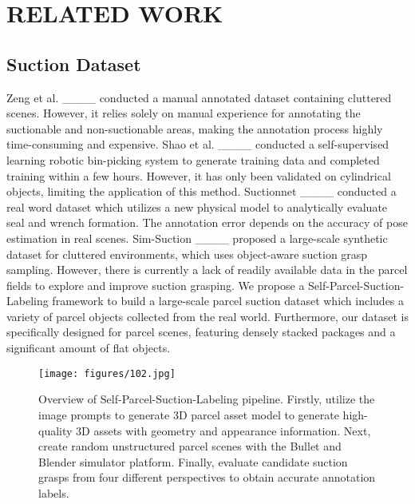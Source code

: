 \section{RELATED WORK}
\label{introduction}



\subsection{Suction Dataset} 
Zeng et al. ____ conducted a manual annotated dataset containing cluttered scenes. However, it relies solely on manual experience for annotating the suctionable and non-suctionable areas, making the annotation process highly time-consuming and expensive. Shao et al. ____ conducted a self-supervised learning robotic bin-picking system to generate training data and completed training within a few hours. However, it has only been validated on cylindrical objects, limiting the application of this method. Suctionnet ____ conducted a real word dataset which utilizes a new physical model to analytically evaluate seal and wrench formation. The annotation error depends on the accuracy of pose estimation in real scenes. Sim-Suction ____ proposed a large-scale synthetic dataset for cluttered environments, which uses object-aware suction grasp sampling. However, there is currently a lack of readily available data in the parcel fields to explore and improve suction grasping. We propose a Self-Parcel-Suction-Labeling framework to build a large-scale parcel suction dataset which includes a variety of parcel objects collected from the real world. Furthermore, our dataset is specifically designed for parcel scenes, featuring densely stacked packages and a significant amount of flat objects.


\begin{figure*}[t]
	\centering
		\texttt{[image: figures/102.jpg]}
	\caption{Overview of Self-Parcel-Suction-Labeling pipeline. Firstly, utilize the image prompts to generate 3D parcel asset model to generate high-quality 3D assets with geometry and appearance information. Next, create random unstructured parcel scenes with the Bullet and Blender simulator platform. Finally, evaluate candidate suction grasps from four different perspectives to obtain accurate annotation labels.
    }
	\label{fig:fig102}
\end{figure*}


